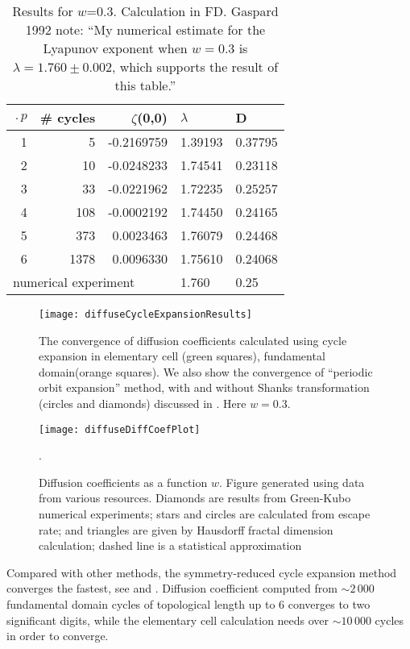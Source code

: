 \begin{table}[htbp]
\hfill
\begin{tabular}{|r|r|r|l|l|}
\hline
$\period{p}$ & \# cycles & $\zeta$(0,0) & $\lambda$ & D \\ \hline\hline
1      & 5      & -0.2169759 & 1.39193 & 0.37795 \\
2      & 10     & -0.0248233 & 1.74541 & 0.23118 \\
3      & 33     & -0.0221962 & 1.72235 & 0.25257 \\
4      & 108    & -0.0002192 & 1.74450 & 0.24165 \\
5      & 373    &  0.0023463 & 1.76079 & 0.24468 \\
6      & 1378   &  0.0096330 & 1.75610 & 0.24068 \\ \hline\hline
\multicolumn{3}{|l|}{numerical experiment}
                             & 1.760   & 0.25
\\ \hline
\end{tabular}
\caption{\label{TCELL2}
  Results for $w$=0.3. Calculation in FD. Gaspard 1992 note: ``My
  numerical estimate for the Lyapunov exponent when $w=0.3$ is
  $\lambda = 1.760 \pm 0.002$, which supports the result of this
  table.''
}
\end{table}

\begin{figure}[htbp]
  \texttt{[image: diffuseCycleExpansionResults]}
  \caption[]{\label{fig-convergence}
  The convergence of diffusion coefficients  calculated using cycle
  expansion in elementary cell (green squares),  fundamental
  domain(orange squares). We  also show the convergence of ``periodic
  orbit expansion'' method, with and  without Shanks transformation
  (circles and diamonds) discussed in  . Here $w =
  0.3$.
  }
\end{figure}

\begin{figure}
\texttt{[image: diffuseDiffCoefPlot]}
  \caption[]{\label{fig-results} Diffusion coefficients as a function
  $w$.  Figure generated using data from various resources. Diamonds
  are results from  Green-Kubo numerical experiments;
  stars and  circles are calculated from
  escape rate; and triangles are  given by Hausdorff fractal dimension
  calculation; dashed line  is a statistical
  approximation}.
\end{figure}


Compared with other methods, the symmetry-reduced cycle expansion
method converges the fastest, see  and
. Diffusion coefficient computed from
$\sim2\,000$ fundamental domain cycles of topological length up to 6
converges to two significant digits, while the elementary cell calculation
needs over $\sim 10\,000$ cycles in order to converge.

